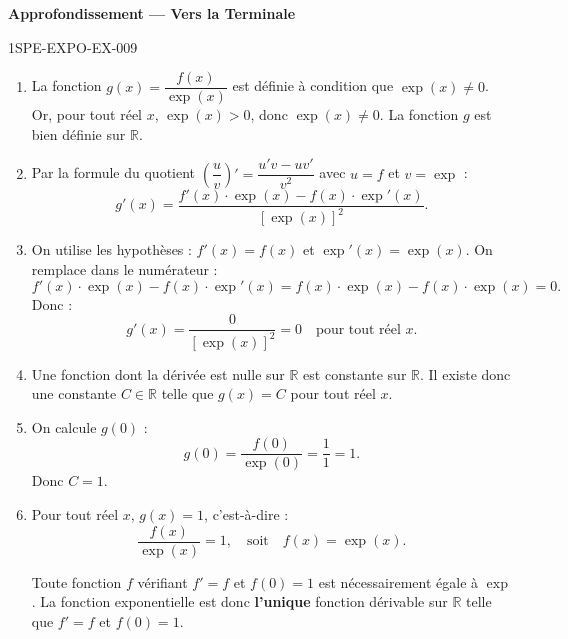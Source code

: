 \begin{center}\textbf{Approfondissement — Vers la Terminale}\end{center}
\begin{corrige}{1SPE-EXPO-EX-009}
\begin{enumerate}
\item La fonction $g(x) = \dfrac{f(x)}{\exp(x)}$ est définie à condition que $\exp(x)
\neq 0$. Or, pour tout réel $x$, $\exp(x) > 0$, donc $\exp(x)
\neq 0$. La fonction $g$ est bien définie sur $\mathbb{R}$.

\item Par la formule du quotient $\left(\dfrac{u}{v}\right)' = \dfrac{u'v - uv'}{v^2}$ avec $u = f$ et $v = \exp$ :
\[g'(x) = \frac{f'(x) \cdot \exp(x) - f(x) \cdot \exp'(x)}{[\exp(x)]^2}.\]

\item On utilise les hypothèses : $f'(x) = f(x)$ et $\exp'(x) = \exp(x)$. On remplace dans le numérateur :
\[f'(x) \cdot \exp(x) - f(x) \cdot \exp'(x) = f(x) \cdot \exp(x) - f(x) \cdot \exp(x) = 0.\]
Donc :
\[g'(x) = \frac{0}{[\exp(x)]^2} = 0 \quad \text{pour tout réel } x.\]

\item Une fonction dont la dérivée est nulle sur $\mathbb{R}$ est constante sur $\mathbb{R}$. Il existe donc une constante $C \in \mathbb{R}$ telle que $g(x) = C$ pour tout réel $x$.

\item On calcule $g(0)$ :
\[g(0) = \frac{f(0)}{\exp(0)} = \frac{1}{1} = 1.\]
Donc $C = 1$.

\item Pour tout réel $x$, $g(x) = 1$, c'est-à-dire :
\[\frac{f(x)}{\exp(x)} = 1, \quad \text{soit} \quad f(x) = \exp(x).\]

Toute fonction $f$ vérifiant $f' = f$ et $f(0) = 1$ est nécessairement égale à $\exp$. La fonction exponentielle est donc \textbf{l'unique} fonction dérivable sur $\mathbb{R}$ telle que $f' = f$ et $f(0) = 1$.
\end{enumerate}
\end{corrige}
